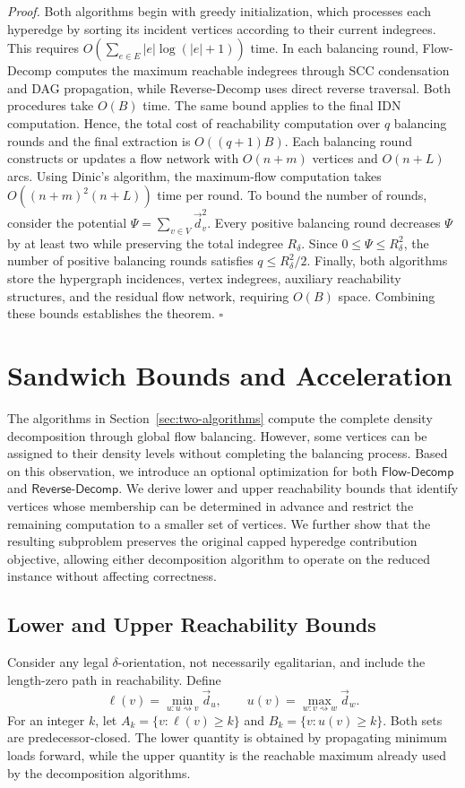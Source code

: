 \documentclass[twocolumn]{svjour3}
\newcommand{\kw}[1]{{\ensuremath{\mathsf{#1}}}\xspace}
\begin{document}
\emph{Proof.}
Both algorithms begin with greedy initialization, which
processes each hyperedge by sorting its incident vertices
according to their current indegrees. This requires
$O(\sum_{e\in E}|e|\log(|e|+1))$ time.
In each balancing round, Flow-Decomp computes the
maximum reachable indegrees through SCC condensation
and DAG propagation, while Reverse-Decomp uses direct
reverse traversal. Both procedures take $O(B)$ time.
The same bound applies to the final IDN computation.
Hence, the total cost of reachability computation over
$q$ balancing rounds and the final extraction is
$O((q+1)B)$.
Each balancing round constructs or updates a flow network
with $O(n+m)$ vertices and $O(n+L)$ arcs.
Using Dinic's algorithm, the maximum-flow computation
takes $O((n+m)^2(n+L))$ time per round.
To bound the number of rounds, consider the potential
$\Psi=\sum_{v\in V}\vec d_v^2$.
Every positive balancing round decreases $\Psi$ by at
least two while preserving the total indegree $R_\delta$.
Since $0\le\Psi\le R_\delta^2$, the number of positive
balancing rounds satisfies $q\le R_\delta^2/2$.
Finally, both algorithms store the hypergraph incidences,
vertex indegrees, auxiliary reachability structures,
and the residual flow network, requiring $O(B)$ space.
Combining these bounds establishes the theorem.
\hfill$\square$


\section{Sandwich Bounds and Acceleration}
\label{sec:sandwich}

The algorithms in Section~\ref{sec:two-algorithms} compute the complete density decomposition through global flow balancing. However, some vertices can be assigned to their density levels without completing the balancing process. Based on this observation, we introduce an optional optimization for both \kw{Flow\text{-}Decomp} and \kw{Reverse\text{-}Decomp}. We derive lower and upper reachability bounds that identify vertices whose membership can be determined in advance and restrict the remaining computation to a smaller set of vertices. We further show that the resulting subproblem preserves the original capped hyperedge contribution objective, allowing either decomposition algorithm to operate on the reduced instance without affecting correctness.



\subsection{Lower and Upper Reachability Bounds}
Consider any legal $\delta$-orientation, not necessarily egalitarian, and include the length-zero path in reachability. Define
\begin{equation*}
 \ell(v)=\min_{u:u\rightsquigarrow v}\vec d_u,
 \qquad
 u(v)=\max_{w:v\rightsquigarrow w}\vec d_w.
\end{equation*}
For an integer $k$, let $A_k=\{v:\ell(v)\ge k\}$ and $B_k=\{v:u(v)\ge k\}$. Both sets are predecessor-closed. The lower quantity is obtained by propagating minimum loads forward, while the upper quantity is the reachable maximum already used by the decomposition algorithms.
\end{document}
